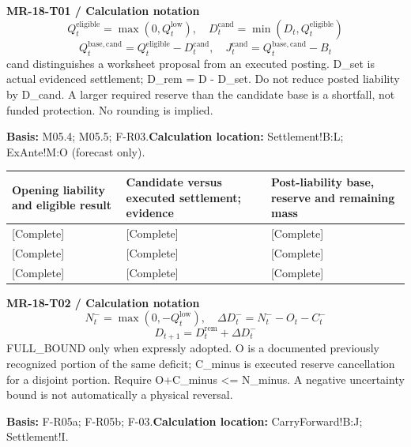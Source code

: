 \par\begingroup\sffamily\fontsize{8.4}{10.5}\selectfont\color{NEBGreen}
\textbf{MR-18-T01 / Calculation notation}\
{\fontsize{10}{12}\selectfont\[Q_t^{\mathrm{eligible}}=\max(0,Q_t^{\mathrm{low}}),\quad D_t^{\mathrm{cand}}=\min(D_t,Q_t^{\mathrm{eligible}})\]}
{\fontsize{10}{12}\selectfont\[Q_t^{\mathrm{base,cand}}=Q_t^{\mathrm{eligible}}-D_t^{\mathrm{cand}},\quad J_t^{\mathrm{cand}}=Q_t^{\mathrm{base,cand}}-B_t\]}
cand distinguishes a worksheet proposal from an executed posting. D\_set is actual evidenced settlement; D\_rem = D - D\_set. Do not reduce posted liability by D\_cand. A larger required reserve than the candidate base is a shortfall, not funded protection. No rounding is implied.\par
\textbf{Basis:} M05.4; M05.5; F-R03.\quad\textbf{Calculation location:} Settlement!B:L; ExAnte!M:O (forecast only).\par\endgroup
{\sffamily\fontsize{8.6}{10.7}\selectfont\begin{longtable}{@{}P{48mm}P{61mm}P{53mm}@{}}
\toprule
\textbf{Opening liability and eligible result} & \textbf{Candidate versus executed settlement; evidence} & \textbf{Post-liability base, reserve and remaining mass}\\\midrule\endhead
\rule{0pt}{8mm}[Complete] & [Complete] & [Complete]\\\hline
\rule{0pt}{8mm}[Complete] & [Complete] & [Complete]\\\hline
\rule{0pt}{8mm}[Complete] & [Complete] & [Complete]\\\hline
\end{longtable}}
\par\begingroup\sffamily\fontsize{8.4}{10.5}\selectfont\color{NEBGreen}
\textbf{MR-18-T02 / Calculation notation}\
{\fontsize{10}{12}\selectfont\[N_t^-=\max(0,-Q_t^{\mathrm{low}}),\quad \Delta D_t^-=N_t^- -O_t-C_t^-\]}
{\fontsize{10}{12}\selectfont\[D_{t+1}=D_t^{\mathrm{rem}}+\Delta D_t^-\]}
FULL\_BOUND only when expressly adopted. O is a documented previously recognized portion of the same deficit; C\_minus is executed reserve cancellation for a disjoint portion. Require O+C\_minus <= N\_minus. A negative uncertainty bound is not automatically a physical reversal.\par
\textbf{Basis:} F-R05a; F-R05b; F-03.\quad\textbf{Calculation location:} CarryForward!B:J; Settlement!I.\par\endgroup
